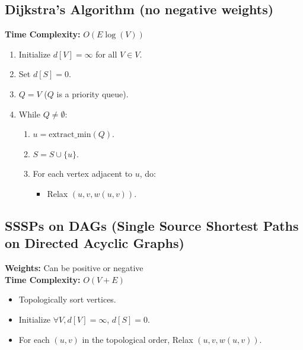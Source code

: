 \subsection{Dijkstra's Algorithm (no negative weights)}
\begin{definition}
    \textbf{Time Complexity:} \( O(E \log(V)) \)

    \begin{enumerate}
        \item Initialize \( d[V] = \infty \) for all \( V \in V \).
        \item Set \( d[S] = 0 \).
        \item \( Q = V \) \quad (\( Q \) is a priority queue).
        \item While \( Q \neq \emptyset \):
        \begin{enumerate}
            \item \( u = \text{extract\_min}(Q) \).
            \item \( S = S \cup \{ u \} \).
            \item For each vertex adjacent to \( u \), do:
            \begin{itemize}
                \item Relax \( (u, v, w(u, v)) \).
            \end{itemize}
        \end{enumerate}
    \end{enumerate}
\end{definition}

\subsection{SSSPs on DAGs (Single Source Shortest Paths on Directed Acyclic Graphs)}
\begin{definition}
    \textbf{Weights:} Can be positive or negative \\
    \textbf{Time Complexity:} \( O(V + E) \)


    \begin{itemize}
        \item Topologically sort vertices.
        \item Initialize \( \forall V, d[V] = \infty \), \( d[S] = 0 \).
        \item For each \( (u, v) \) in the topological order, Relax \( (u, v, w(u, v)) \).
    \end{itemize}
\end{definition}